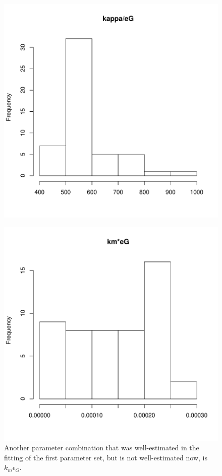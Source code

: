 \documentclass[12pt,reqno,final]{amsart}
\theoremstyle{plain}
\numberwithin{equation}{part}
\begin{document}
\begin{figure}
\includegraphics{Solving_the_problem_of_parameter_covariation_4-004}
\end{figure}


\begin{figure}
\includegraphics{Solving_the_problem_of_parameter_covariation_4-005}
\caption{Another parameter combination that was well-estimated in the fitting
of the first parameter set, but is not well-estimated now, is $k_m
\epsilon_G$.}
\end{figure}
\end{document}
